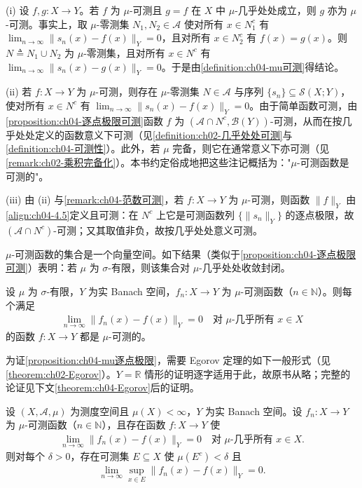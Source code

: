\documentclass[../../main.tex]{subfiles}%
\begin{document}
\begin{remark}\label{remark:ch04-mu可测注}
(i) 设 $f,g:X\to Y$。若 $f$ 为 $\mu$-可测且 $g=f$ 在 $X$ 中 $\mu$-几乎处处成立，则 $g$ 亦为 $\mu$-可测。事实上，取 $\mu$-零测集 $N_1,N_2\in\mathcal{A}$ 使对所有 $x\in N_1^c$ 有 $\lim_{n\to\infty}\|s_n(x)-f(x)\|_Y=0$，且对所有 $x\in N_2^c$ 有 $f(x)=g(x)$。则 $N\triangleq N_1\cup N_2$ 为 $\mu$-零测集，且对所有 $x\in N^c$ 有 $\lim_{n\to\infty}\|s_n(x)-g(x)\|_Y=0$。于是由\cref{definition:ch04-mu可测}得结论。

(ii) 若 $f:X\to Y$ 为 $\mu$-可测，则存在 $\mu$-零测集 $N\in\mathcal{A}$ 与序列 $\{s_n\}\subseteq\mathcal{S}(X;Y)$，使对所有 $x\in N^c$ 有 $\lim_{n\to\infty}\|s_n(x)-f(x)\|_Y=0$。由于简单函数可测，由\cref{proposition:ch04-逐点极限可测}函数 $f$ 为 $(\mathcal{A}\cap N^c,\mathcal{B}(Y))$-可测，从而在按几乎处处定义的函数意义下可测（见\cref{definition:ch02-几乎处处可测}与\cref{definition:ch04-可测性}）。此外，若 $\mu$ 完备，则它在通常意义下亦可测（见\cref{remark:ch02-乘积完备化}）。本书约定俗成地把这些注记概括为："$\mu$-可测函数是可测的"。

(iii) 由 (ii) 与\cref{remark:ch04-范数可测}，若 $f:X\to Y$ 为 $\mu$-可测，则函数 $\|f\|_Y$ 由\eqref{align:ch04-4.5}定义且可测：在 $N^c$ 上它是可测函数列 $\{\|s_n\|_Y\}$ 的逐点极限，故 $(\mathcal{A}\cap N^c)$-可测；又其取值非负，故按几乎处处意义可测。
\end{remark}

$\mu$-可测函数的集合是一个向量空间。如下结果（类似于\cref{proposition:ch04-逐点极限可测}）表明：若 $\mu$ 为 $\sigma$-有限，则该集合对 $\mu$-几乎处处收敛封闭。

\begin{proposition}\label{proposition:ch04-mu逐点极限}
设 $\mu$ 为 $\sigma$-有限，$Y$ 为实 Banach 空间，$f_n:X\to Y$ 为 $\mu$-可测函数（$n\in\mathbb{N}$）。则每个满足
\begin{align*}
\lim_{n\to\infty}\|f_n(x)-f(x)\|_Y=0\quad\text{对 }\mu\text{-几乎所有 }x\in X
\end{align*}
的函数 $f:X\to Y$ 都是 $\mu$-可测的。
\end{proposition}

为证\cref{proposition:ch04-mu逐点极限}，需要 Egorov 定理的如下一般形式（见\cref{theorem:ch02-Egorov}）。$Y=\mathbb{R}$ 情形的证明逐字适用于此，故原书从略；完整的论证见下文\cref{theorem:ch04-Egorov}后的证明。

\begin{theorem}[Egorov]\label{theorem:ch04-Egorov}
设 $(X,\mathcal{A},\mu)$ 为测度空间且 $\mu(X)<\infty$，$Y$ 为实 Banach 空间。设 $f_n:X\to Y$ 为 $\mu$-可测函数（$n\in\mathbb{N}$），且存在函数 $f:X\to Y$ 使
\begin{align*}
\lim_{n\to\infty}\|f_n(x)-f(x)\|_Y=0\quad\text{对 }\mu\text{-几乎所有 }x\in X.
\end{align*}
则对每个 $\delta>0$，存在可测集 $E\subseteq X$ 使 $\mu(E^c)<\delta$ 且
\begin{align*}
\lim_{n\to\infty}\sup_{x\in E}\|f_n(x)-f(x)\|_Y=0.
\end{align*}
\end{theorem}
\end{document}
